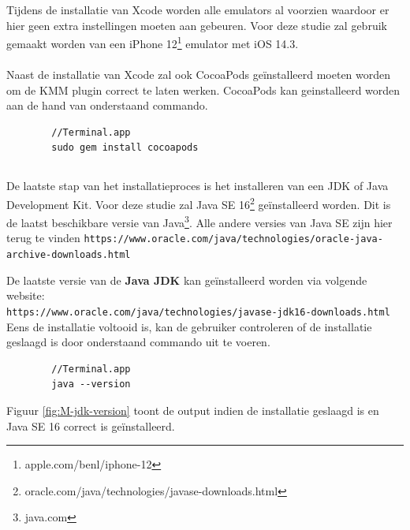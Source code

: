     Tijdens de installatie van Xcode worden alle emulators al voorzien waardoor er hier geen extra instellingen moeten aan gebeuren. Voor deze studie zal gebruik gemaakt worden van een iPhone 12\footnote{apple.com/benl/iphone-12} emulator met iOS 14.3.
    \\ \\
    Naast de installatie van Xcode zal ook CocoaPods geïnstalleerd moeten worden om de KMM plugin correct te laten werken. CocoaPods kan geinstalleerd worden aan de hand van onderstaand commando.
    
    \begin{lstlisting}
        //Terminal.app
        sudo gem install cocoapods
    \end{lstlisting}
    
    \subsection{}
    \label{sec:I-JDK}
    De laatste stap van het installatieproces is het installeren van een JDK of Java Development Kit. Voor deze studie zal Java SE 16\footnote{oracle.com/java/technologies/javase-downloads.html} geïnstalleerd worden. Dit is de laatst beschikbare versie van Java\footnote{java.com}. Alle andere versies van Java SE zijn hier terug te vinden \verb*|https://www.oracle.com/java/technologies/oracle-java-archive-downloads.html|
    
    De laatste versie van de \textbf{Java JDK} kan geïnstalleerd worden via volgende website: \\
    \verb*|https://www.oracle.com/java/technologies/javase-jdk16-downloads.html|
    \\
    
    Eens de installatie voltooid is, kan de gebruiker controleren of de installatie geslaagd is door onderstaand commando uit te voeren.
    \begin{lstlisting}
        //Terminal.app
        java --version
    \end{lstlisting}
    Figuur \ref{fig:M-jdk-version} toont de output indien de installatie geslaagd is en Java SE 16 correct is geïnstalleerd.
    

